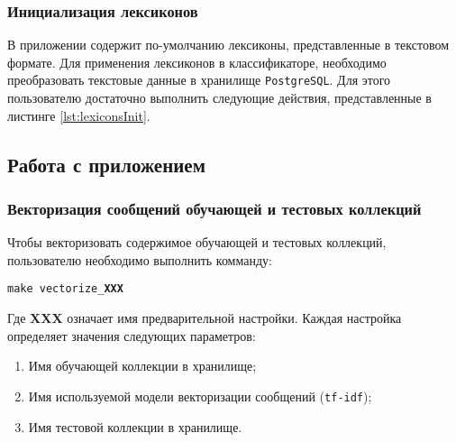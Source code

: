         \subsubsection{Инициализация лексиконов}
        В приложении содержит по-умолчанию лексиконы, представленные в текстовом
        формате. Для применения лексиконов в классификаторе, необходимо преобразовать
        текстовые данные в хранилище {\tt PostgreSQL}. Для этого пользователю
        достаточно выполнить следующие действия, представленные в листинге \ref{lst:lexiconsInit}.
        \lstset{style=bash}
        

    \subsection{Работа с приложением}
        \subsubsection{Векторизация сообщений обучающей и тестовых коллекций}
        \label{sec:usage_vectorize}
        Чтобы векторизовать содержимое обучающей и тестовых коллекций, пользователю
        необходимо выполнить комманду:
        \begin{center}
            {\tt make vectorize\_{\bf XXX}}
        \end{center}

        Где {\bf XXX} означает имя предварительной настройки. Каждая настройка
        определяет значения следующих параметров:
        \begin{enumerate}
            \item Имя обучающей коллекции в хранилище;
            \item Имя используемой модели векторизации сообщений ({\tt tf-idf});
            \item Имя тестовой коллекции в хранилище.
        \end{enumerate}

